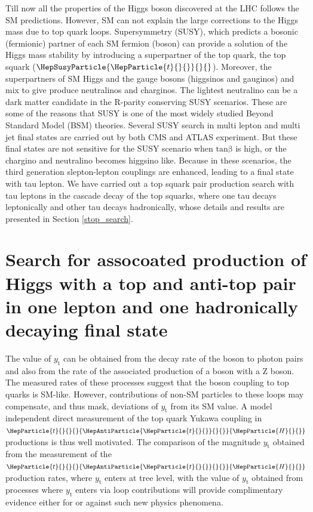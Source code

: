 \documentclass[11.5pt, a4paper]{article}
\newcommand{\yt}{\ensuremath{y_{\mathrm{t}}}}
\DeclareRobustCommand{\PH}{{\HepParticle{H}{}{}}\xspace}
\DeclareRobustCommand{\PQt}{\HepParticle{t}{}{}} %
\DeclareRobustCommand{\PAQt}{{\HepAntiParticle{\PQt}{}{}}\xspace} %
\DeclareRobustCommand{\PSQt}{{\HepSusyParticle{\PQt}{}{}}\xspace} %
\newcommand{\ttbar}{\PQt{}\PAQt} %
\newcommand{\ttH}{\ttbar\PH}
\begin{document}
Till now all the properties of the Higgs boson discovered at the LHC follows the SM predictions. However, SM can not explain the large corrections to the Higgs mass due to top quark loops. Supersymmetry (SUSY), which predicts a bosonic (fermionic) partner of each SM fermion (boson) can provide a solution of the Higgs mass stability by introducing a superpartner of the top quark, the top squark ($\PSQt$). Moreover, the superpartners of SM Higgs and the gauge bosons (higgsinos and gauginos) and mix to give produce neutralinos and charginos. The lightest neutralino can be a dark matter candidate in the R-parity conserving SUSY scenarios\cite{FARRAR1978575}. These are some of the reasons that SUSY is one of the most widely studied Beyond Standard Model (BSM) theories. Several SUSY search in multi lepton and multi jet final states are carried out by both CMS and ATLAS experiment. But these final states are not sensitive for the SUSY scenario when $\mathrm{tan\beta}$ is high, or the chargino and neutralino becomes higgsino like. Because in these scenarios, the third generation slepton-lepton couplings are enhanced, leading to a final state with tau lepton. We have carried out a top squark pair production search with tau leptons in the cascade decay of the top squarks, where one tau decays leptonically and other tau decays hadronically, whose details and results are presented in Section \ref{stop_search}.


\section{Search for assocoated production of Higgs with a top and anti-top pair in one lepton and one hadronically decaying final state} \label{ttH}

The value of $\yt$ can be obtained from the decay rate of the \PH boson to photon pairs\cite{Biswas:2013xva} and also from the rate of the associated production of a \PH boson with a Z boson\cite{Hespel:2015zea}. The measured rates of these processes suggest that the \PH boson coupling to top quarks is SM-like. However, contributions of non-SM particles to these loops may compensate, and thus mask, deviations of $\yt$ from its SM value. A model independent direct measurement of the top quark Yukawa coupling in $\ttH$ productions is thus well motivated. The comparison of the magnitude $\yt$ obtained from the measurement of the $\ttH$ production rates,
where $\yt$ enters at tree level, with the value of $\yt$ obtained from processes where $\yt$ enters via loop contributions will provide complimentary evidence either for or against such new physics phenomena.
\end{document}
